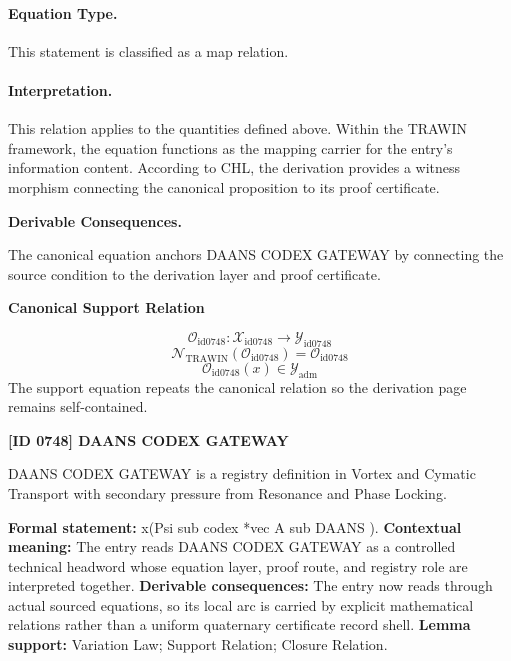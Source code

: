 \paragraph{Equation Type.}
This statement is classified as a map relation.

\paragraph{Interpretation.}
This relation applies to the quantities defined above. Within the TRAWIN framework, the equation functions as the mapping carrier for the entry’s information content. According to CHL, the derivation provides a witness morphism connecting the canonical proposition to its proof certificate.

\par\vspace{0.35em}
\noindent\textbf{Derivable Consequences.}\quad
\begingroup
\footnotesize
\raggedright
The canonical equation anchors DAANS CODEX GATEWAY by connecting the source condition to the derivation layer and proof certificate.
\par\endgroup

\noindent\textbf{Canonical Support Relation}\par
\[
\mathcal{O}_{\mathrm{id0748}}:\mathcal{X}_{\mathrm{id0748}}\longrightarrow\mathcal{Y}_{\mathrm{id0748}}
\]
\[
\mathcal{N}_{\mathrm{TRAWIN}}(\mathcal{O}_{\mathrm{id0748}})=\mathcal{O}_{\mathrm{id0748}}
\]
\[
\mathcal{O}_{\mathrm{id0748}}(x)\in\mathcal{Y}_{\mathrm{adm}}
\]
\noindent The support equation repeats the canonical relation so the derivation page remains self-contained.\par

\clearpage
\noindent\textbf{[ID 0748] DAANS CODEX GATEWAY}\par
\vspace{0.35em}
\begingroup\small
{}
DAANS CODEX GATEWAY is a registry definition in Vortex and Cymatic Transport with secondary pressure from Resonance and Phase Locking.

\begingroup\footnotesize\setlength{\emergencystretch}{3em}\sloppy
\textbf{Formal statement:} x(Psi sub codex *vec A sub DAANS ). \textbf{Contextual meaning:} The entry reads DAANS CODEX GATEWAY as a controlled technical headword whose equation layer, proof route, and registry role are interpreted together. \textbf{Derivable consequences:} The entry now reads through actual sourced equations, so its local arc is carried by explicit mathematical relations rather than a uniform quaternary certificate record shell. \textbf{Lemma support:} Variation Law; Support Relation; Closure Relation.\par
\endgroup

